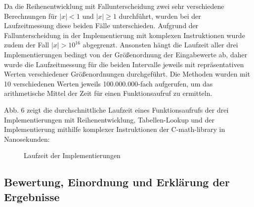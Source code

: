 \documentclass[course=erap] {aspdoc}
\begin{document}
    Da die Reihenentwicklung mit Fallunterscheidung zwei sehr verschiedene Berechnungen für $|x|<1$ und $|x|\geq 1$ durchführt, wurden bei der Laufzeitmessung diese beiden Fälle unterschieden. Aufgrund der Fallunterscheidung in der Implementierung mit komplexen Instruktionen wurde zudem der Fall $|x|>10^{16}$ abgegrenzt.
    Ansonsten hängt die Laufzeit aller drei Implementierungen bedingt von der Größenordnung der Eingabewerte ab, daher wurde die Laufzeitmessung für die beiden Intervalle jeweils mit repräsentativen Werten verschiedener Größenordnungen durchgeführt.
    Die Methoden wurden mit 10 verschiedenen Werten jeweils 100.000.000-fach aufgerufen, um das arithmetische Mittel der Zeit für einen Funktionsaufruf zu ermitteln.

    Abb. 6 zeigt die durchschnittliche Laufzeit eines Funktionsaufrufs der drei Implementierungen mit Reihenentwicklung, Tabellen-Lookup und der Implementierung mithilfe komplexer Instruktionen der C-math-library in Nanosekunden:

    \begin{figure}
        \caption{Laufzeit der Implementierungen}
    \end{figure}

    \subsection{Bewertung, Einordnung und Erklärung der Ergebnisse}\label{subsec:bewertung-einordnung-und-erklarung-der-ergebnisse}
\end{document}
